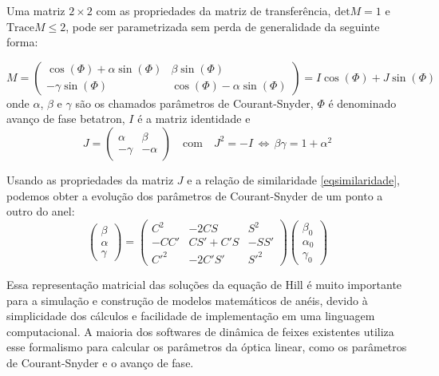 Uma matriz $2\times2$ com as propriedades da matriz de transferência, $\mathrm{det}M=1$ e $\mathrm{Trace}M\leq 2$, pode ser parametrizada sem perda de generalidade da seguinte forma:

\begin{equation}
 M = \left(
\begin{array}{cc}
 \cos(\Phi) + \alpha \sin(\Phi)  & \beta \sin(\Phi) \\
 -\gamma \sin(\Phi) & \cos(\Phi) -\alpha \sin(\Phi)
\end{array} \right) = I \cos(\Phi) + J\sin(\Phi)
\end{equation}
onde $\alpha$, $\beta$ e $\gamma$ são os chamados parâmetros de Courant-Snyder, $\Phi$ é denominado avanço de fase betatron, $I$ é a matriz identidade e
\begin{equation}
 J= \left(\begin{array}{cc}
          \alpha  & \beta \\
          -\gamma & -\alpha
         \end{array} \right)
\quad \mathrm{com} \quad J^2=-I \, \Leftrightarrow
\, \beta \gamma = 1+ \alpha^2
\end{equation}

Usando as propriedades da matriz $J$ e a relação de similaridade  \eqref{eqsimilaridade}, podemos obter a evolução dos parâmetros de Courant-Snyder de um ponto a outro do anel:
\begin{equation}\label{eqevolparcouder}
\left(\begin{array}{c}
       \beta \\ \alpha \\ \gamma
      \end{array}\right) =
\left(\begin{array}{ccc}
       C^2    &   -2 C S      &  S^2   \\
       -C C'  &  C S' + C' S  &  -S S' \\
       C'^2   & -2 C' S'      &  S'^2
      \end{array}\right)
\left(\begin{array}{c}
       \beta_0 \\ \alpha_0 \\ \gamma_0
      \end{array}\right)
\end{equation}

Essa representação matricial das soluções da equação de Hill é muito importante para a simulação e construção de modelos matemáticos de anéis, devido à simplicidade dos cálculos e facilidade de implementação em uma linguagem computacional.
A maioria dos softwares de dinâmica de feixes existentes utiliza esse formalismo para calcular os parâmetros da óptica linear, como os parâmetros de Courant-Snyder e o avanço de fase.

